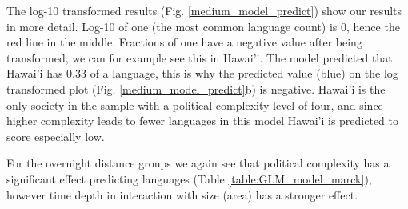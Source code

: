 \documentclass[a4paper,10pt]{article} %
\begin{document}
The log-10 transformed results (Fig. \ref{medium_model_predict}) show our results in more detail. Log-10 of one (the most common language count) is 0, hence the red line in the middle. Fractions of one have a negative value after being transformed, we can for example see this in Hawai'i. The model predicted that Hawai'i has 0.33 of a language, this is why the predicted value (blue) on the log transformed plot (Fig. \ref{medium_model_predict}b) is negative. Hawai'i is the only society in the sample with a political complexity level of four, and since higher complexity leads to fewer languages in this model Hawai'i is predicted to score especially low.



For the overnight distance groups we again see that political complexity has a significant effect predicting languages (Table \ref{table:GLM_model_marck}), however time depth in interaction with size (area) has a stronger effect.
\end{document}
